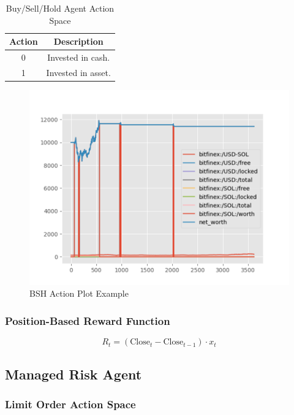 \documentclass[journal]{new-aiaa}
\begin{document}
\begin{table}[hbt!]
        \centering
        \begin{tabular}{||c|c||}
                \hline
                \textbf{Action} & \textbf{Description} \\
                \hline
                \hline
                0 & Invested in cash. \\
                \hline
                1 & Invested in asset. \\
                \hline
        \end{tabular}
        \caption{Buy/Sell/Hold Agent Action Space}
        \label{tab:Buy_Sell_Hold_Agent_Action_Space}
\end{table}

\begin{figure}[hbt!]
        \centering
        \includegraphics[width=.6\textwidth]{figures/BSH_Action_Example.png}
        \caption{BSH Action Plot Example}
        \label{fig:Limit Order Action Plot Example}
\end{figure}

\subsubsection{Position-Based Reward Function}\label{sec:Model_Design:Buy_Sell_Hold_Agent:Position_Based_Reward_Function}

\begin{equation}\label{eq:Position_Based_Reward_Function}
        R_t = \left(\text{Close}_{t} - \text{Close}_{t-1}\right) \cdot x_t
\end{equation}

\subsection{Managed Risk Agent}\label{sec:Model_Design:Managed_Risk_Agent}

\subsubsection{Limit Order Action Space}\label{sec:Model_Design:Managed_Risk_Agent:Limit_Order_Action_Space}
\end{document}
